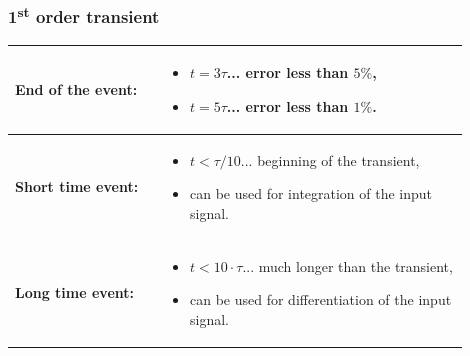 \documentclass{beamer}
\begin{document}
	\begin{frame}
    \frametitle{1\textsuperscript{st} order transient}
		\begin{center}
		\begin{tabular}{m{0.3\linewidth} m{0.6\linewidth}}
			\textbf{End of the event: }  												&  \small{\begin{itemize}
																															 \item $t = 3\tau$... error less than $5\%$,
																															 \item $t = 5\tau$... error less than $1\%$.
																														 \end{itemize}}\\
			\hline
			\textbf{Short time event: }  												&  \small{\begin{itemize}
																															 \item $t < \tau/10$... beginning of the transient,
																															 \item can be used for integration of the input signal.
																														 \end{itemize}}\\
			\hline
	    \textbf{Long time event: }  												&  \small{\begin{itemize}
																															 \item $t < 10\cdot\tau$... much longer than the transient,
																															 \item can be used for differentiation of the input signal.
																														 \end{itemize}}
		\end{tabular}
		\end{center}
  \end{frame}
\end{document}
